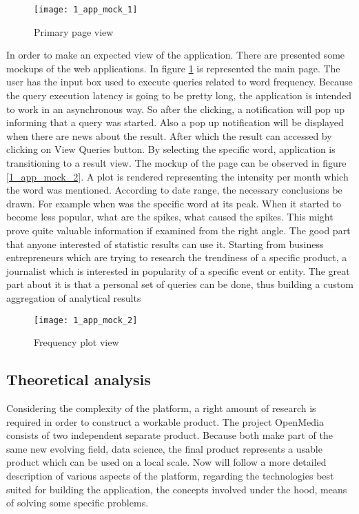 \begin{figure}[!ht]
\centering
\texttt{[image: 1\_app\_mock\_1]}
\caption{Primary page view}\label{app_mock_1}
\end{figure}

In order to make an expected view of the application. There are presented some mockups of the web applications. In figure \ref{app_mock_1} is represented the main page. The user has the input box used to execute queries related to word frequency. Because the query execution latency is going to be pretty long, the application is intended to work in an asynchronous way. So after the clicking, a notification will pop up informing that a query was started. Also a pop up notification will be displayed when there are news about the result. After which the result can accessed by clicking on View Queries button. By selecting the specific word, application is transitioning to a result view. The mockup of the page can be observed in figure \ref{1_app_mock_2}. A  plot is rendered representing the intensity per month which the word was mentioned. According to date range, the necessary conclusions be drawn. For example when was the specific word at its peak. When it started to become less popular, what are the spikes, what caused the spikes. This might prove quite valuable information if examined from the right angle. The good part that anyone interested of statistic results can use it. Starting from business entrepreneurs which are trying to research the trendiness of a specific product, a journalist which is interested in popularity of a specific event or entity. The great part about it is that a personal set of queries can be done, thus building a custom aggregation of analytical results

\begin{figure}[!ht]
\centering
\texttt{[image: 1\_app\_mock\_2]}
\caption{Frequency plot view}\label{app_mock_2}
\end{figure}

\subsection{Theoretical analysis}
Considering the complexity of the platform, a right amount of research is required in order to construct a workable product. The project OpenMedia consists of two independent separate product. Because both make part of the same new evolving field, data science, the final product represents a usable product which can be used on a local scale. Now will follow a more detailed description of various aspects of the platform, regarding the technologies best suited for building the application, the concepts involved under the hood, means of solving some specific problems.

